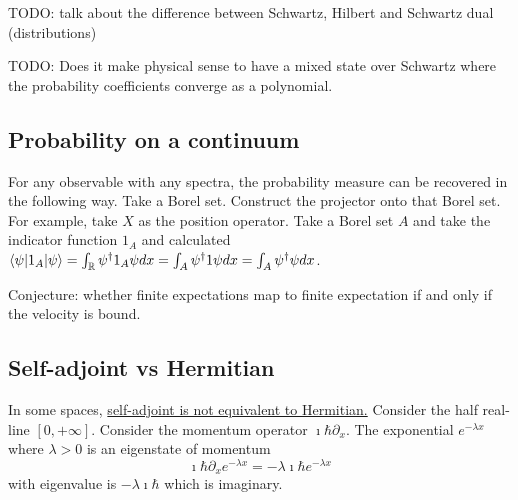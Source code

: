 TODO: talk about the difference between Schwartz, Hilbert and Schwartz dual (distributions)

TODO: Does it make physical sense to have a mixed state over Schwartz where the probability coefficients converge as a polynomial.

\subsection{Probability on a continuum}


For any observable with any spectra, the probability measure can be recovered in the following way. Take a Borel set. Construct the projector onto that Borel set. For example, take $X$ as the position operator. Take a Borel set $A$ and take the indicator function $1_A$ and calculated $\langle \psi | 1_A | \psi \rangle = \int_{\mathbb{R}} \psi^\dagger 1_A \psi dx = \int_{A} \psi^\dagger 1 \psi dx = \int_{A} \psi^\dagger \psi dx$.

Conjecture: whether finite expectations map to finite expectation if and only if the velocity is bound.




\subsection{Self-adjoint vs Hermitian}

In some spaces,  \href{https://math.stackexchange.com/questions/38387/distinguishing-between-symmetric-hermitian-and-self-adjoint-operators}{self-adjoint is not equivalent to Hermitian.} Consider the half real-line $[0, +\infty]$. Consider the momentum operator $\imath \hbar \partial_x $. The exponential $e^{-\lambda x}$ where $\lambda > 0$ is an eigenstate of momentum
\begin{equation}
	\imath \hbar \partial_x e^{-\lambda x} = - \lambda \imath \hbar e^{-\lambda x}
\end{equation}
with eigenvalue is $- \lambda \imath \hbar$ which is imaginary.

